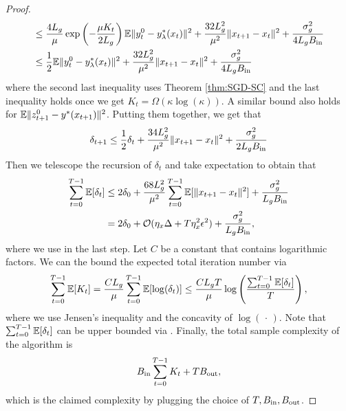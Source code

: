 \begin{proof}
\begin{align}
\begin{split}
    &\le \frac{4 L_g}{\mu} \exp \left( - \frac{\mu K_t}{2L_g} \right) {\mathbb{E}} \Vert y_t^0 - y_{\lambda}^*(x_t) \Vert^2  + \frac{32 L_g^2}{\mu^2}  \Vert x_{t+1} - x_t \Vert^2 + \frac{ \sigma_g^2}{4 L_g B_{\rm in}} \\
    &\le \frac{1}{2} {\mathbb{E}} \Vert y_t^0 - y_{\lambda}^*(x_t) \Vert^2  + \frac{32 L_g^2}{\mu^2}  \Vert x_{t+1} - x_t \Vert^2 + \frac{ \sigma_g^2}{4 L_g B_{\rm in}} 
\end{split}
\end{align}
where the second last inequality uses Theorem \ref{thm:SGD-SC} and the last inequality holds once we get $K_t = \Omega( \kappa \log (\kappa))$.  A similar bound also holds for ${\mathbb{E}} \Vert z_{t+1}^0 - y^*(x_{t+1}) \Vert^2$. Putting them together, we get that
\begin{align*}
    \delta_{t+1} \le \frac{1}{2} \delta_t +  \frac{34 L_g^2}{\mu^2}  \Vert x_{t+1} - x_t \Vert^2 + \frac{ \sigma_g^2}{2 L_g B_{\rm in}}
\end{align*}
Then we telescope the recursion of $\delta_t$ and take expectation to obtain that
\begin{align} \label{eq:ub-deltat}
\begin{split}
        \sum_{t=0}^{T-1} {\mathbb{E}}[\delta_t] &\le 2 \delta_0 + \frac{68  L_g^2}{\mu^2} \sum_{t=0}^{T-1} {\mathbb{E}} [\Vert x_{t+1} - x_t \Vert^2] + \frac{ \sigma_g^2}{ L_g B_{\rm in}} \\
    &=  2 \delta_0 + {\mathcal{O}}(\eta_x \Delta + T \eta_x^2 \epsilon^2) + \frac{ \sigma_g^2}{ L_g B_{\rm in}},
\end{split}
\end{align}
where we use  in the last step. Let $C$ be a constant that  contains logarithmic factors. We can the bound the expected total iteration number via
\begin{align*}
    \sum_{t=0}^{T-1} {\mathbb{E}}[K_t] = \frac{C L_g}{\mu} \sum_{t=0}^{T-1} {\mathbb{E}} [\log (\delta_t)]  \le \frac{C L_g T }{\mu} \log \left( \frac{\sum_{t=0}^{T-1} {\mathbb{E}}[\delta_t]}{T} \right),
\end{align*}
where we use Jensen's inequality and the concavity of $\log (\,\cdot\,)$. Note that $\sum_{t=0}^{T-1} {\mathbb{E}}[\delta_t]$ can be upper bounded via .
Finally, the total sample complexity of the algorithm is
\begin{align*}
    B_{\rm in} \sum_{t=0}^{T-1} K_t + T B_{\rm out},
\end{align*}
which is the claimed complexity by plugging the choice of $T,B_{\rm in}, B_{\rm out}$.
\end{proof}

